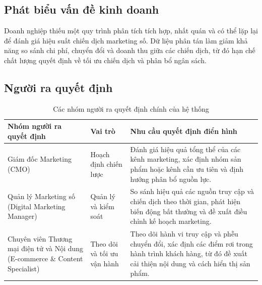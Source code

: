 \subsection{Phát biểu vấn đề kinh doanh}
Doanh nghiệp thiếu một quy trình phân tích tích hợp, nhất quán và có thể lặp lại để đánh giá hiệu suất chiến dịch marketing số. Dữ liệu phân tán làm giảm khả năng so sánh chi phí, chuyển đổi và doanh thu giữa các chiến dịch, từ đó hạn chế chất lượng quyết định về tối ưu chiến dịch và phân bổ ngân sách.

\subsection{Người ra quyết định}
\begin{table}[htbp]
    \centering
    \caption{Các nhóm người ra quyết định chính của hệ thống}
    \label{tab:decision_makers}
    \begin{tabular}{|p{3.5cm}|p{3cm}|p{7cm}|}
        \hline
        \textbf{Nhóm người ra quyết định} &
        \textbf{Vai trò} &
        \textbf{Nhu cầu quyết định điển hình} \\
        \hline
        Giám đốc Marketing (CMO) &
        Hoạch định chiến lược &
        Đánh giá hiệu quả tổng thể của các kênh marketing, xác định nhóm sản phẩm hoặc kênh cần ưu tiên và định hướng phân bổ nguồn lực. \\
        \hline
        Quản lý Marketing số (Digital Marketing Manager) &
        Quản lý và kiểm soát &
        So sánh hiệu quả các nguồn truy cập và chiến dịch theo thời gian, phát hiện biến động bất thường và đề xuất điều chỉnh kế hoạch marketing. \\
        \hline
        Chuyên viên Thương mại điện tử và Nội dung (E-commerce \& Content Specialist) &
        Theo dõi và tối ưu vận hành &
        Theo dõi hành vi truy cập và phễu chuyển đổi, xác định các điểm rơi trong hành trình khách hàng, từ đó đề xuất cải thiện nội dung và cách hiển thị sản phẩm. \\
        \hline
    \end{tabular}
\end{table}